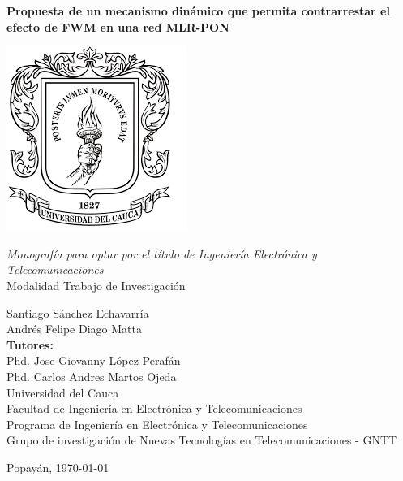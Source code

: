 \begin{center}
    {\textbf{Propuesta de un mecanismo dinámico que permita contrarrestar el efecto de FWM en una red MLR-PON }}\\
    \vfill

    \includegraphics[scale=0.7]{img/logo-unicauca.png} \\
    \vfill

    \textit{Monografía para optar por el título de Ingeniería Electrónica y Telecomunicaciones}\\
    Modalidad Trabajo de Investigación\\
    \vfill

    Santiago Sánchez Echavarría\\
    Andrés Felipe Diago Matta\\
    
    \vfill
    \textbf{Tutores:}\\
    Phd. Jose Giovanny López Perafán \\
    Phd. Carlos Andres Martos Ojeda \\
    
    \vfill
    Universidad del Cauca\\
    Facultad de Ingeniería en Electrónica y Telecomunicaciones\\
    Programa de Ingeniería en Electrónica y Telecomunicaciones\\
    Grupo de investigación de Nuevas Tecnologías en Telecomunicaciones - GNTT\\
    \date{\today}
    Popayán, \today
\end{center} 
